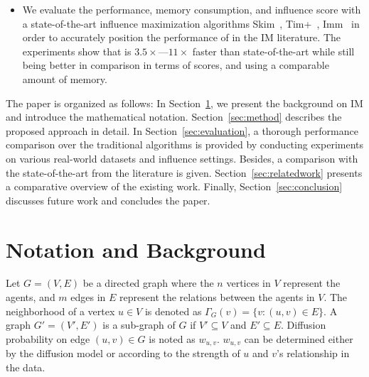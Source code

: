\documentclass[10pt,journal,compsoc]{IEEEtran}
\newcommand\acro{{\sc{HyperFuseR\xspace}\xspace}\xspace}
\newcommand\minspeedup{{{3.5\xspace}\xspace}\xspace}
\newcommand\maxspeedup{{{11\xspace}\xspace}\xspace}
\begin{document}
\begin{itemize}[leftmargin=*]
\item We evaluate the performance, memory consumption, and influence score with a state-of-the-art influence maximization algorithms {\sc Skim}~\cite{cohen2014sketch}, {\sc Tim+}~\cite{tim}, {\sc Imm}~\cite{minutoli2019fast} in order to accurately position the performance of \acro{} in the IM literature. The experiments show that \acro is $\minspeedup\times$—$\maxspeedup\times$ faster than state-of-the-art while still being better in comparison in terms of scores, and using a comparable amount of memory.

\end{itemize}

The paper is organized as follows: 
In Section~\ref{sec:background}, we present 
the background on IM and introduce the mathematical notation. 
Section~\ref{sec:method} describes the proposed approach in detail.
In Section~\ref{sec:evaluation}, a thorough performance comparison over the traditional algorithms is provided by conducting experiments on various real-world datasets and influence settings. Besides, a comparison with the state-of-the-art from the literature is given.
Section~\ref{sec:relatedwork} presents a comparative overview of the existing work. Finally, Section~\ref{sec:conclusion} discusses future work and concludes the paper.






\section{Notation and Background}\label{sec:background}

Let $G = (V,E)$ be a directed graph where the $n$ vertices in $V$ represent the agents, and $m$ edges in $E$ represent the relations between the agents in $V$.
The neighborhood of a vertex $u \in V$ is denoted as $\Gamma_{G}(v) = \{v: (u,v) \in E\}$. 
A graph $G' = (V',E')$ is a sub-graph of $G$ if $V' \subseteq V$ and $E' \subseteq E$. 
Diffusion probability on edge $(u, v) \in G$ is noted as $w_{u,v}$.
$w_{u,v}$ can be determined either by the diffusion model or according to the strength of $u$ and $v$'s relationship in the data.
\end{document}

